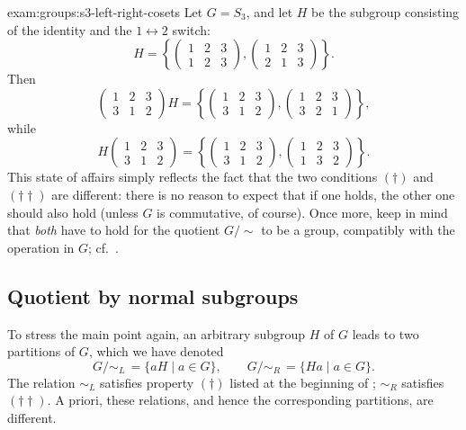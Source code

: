 \begin{exam}{}{exam:groups:s3-left-right-cosets}
  Let $G = S_3$, and let $H$ be the subgroup consisting of the
  identity and the $1 \leftrightarrow 2$ switch:
  \[
    H = \left\{ \begin{pmatrix}1&2&3\\1&2&3\end{pmatrix},
      \begin{pmatrix}1&2&3\\2&1&3\end{pmatrix} \right\}.
  \]
  Then
  \[
    \begin{pmatrix}1&2&3\\3&1&2\end{pmatrix} H =
    \left\{ \begin{pmatrix}1&2&3\\3&1&2\end{pmatrix},
      \begin{pmatrix}1&2&3\\3&2&1\end{pmatrix} \right\},
  \]
  while
  \[
    H \begin{pmatrix}1&2&3\\3&1&2\end{pmatrix} =
    \left\{ \begin{pmatrix}1&2&3\\3&1&2\end{pmatrix},
      \begin{pmatrix}1&2&3\\1&3&2\end{pmatrix} \right\}.
  \]
  This state of affairs simply reflects the fact that the two
  conditions $(\dagger)$ and $(\dagger\dagger)$ are different: there
  is no reason to expect that if one holds, the other one should also
  hold (unless $G$ is commutative, of course). Once more, keep in mind
  that \emph{both} have to hold for the quotient $G/\!\sim$ to be a
  group, compatibly with the operation in $G$; cf.\
  .
\end{exam}

\subsection{Quotient by normal subgroups}
\label{subsec:groups:quotient-by-normal-subgroups}
To stress the main point again, an arbitrary subgroup $H$ of $G$ leads
to two partitions of $G$, which we have denoted
\[
  G/\!\sim_L\, = \{aH \mid a \in G\}, \qquad G/\!\sim_R\, = \{Ha \mid
  a \in G\}.
\]
The relation $\sim_L$ satisfies property $(\dagger)$ listed at the
beginning of \Cref{subsec:groups:cosets}; $\sim_R$ satisfies
$(\dagger\dagger)$. A priori, these relations, and hence the
corresponding partitions, are different.

